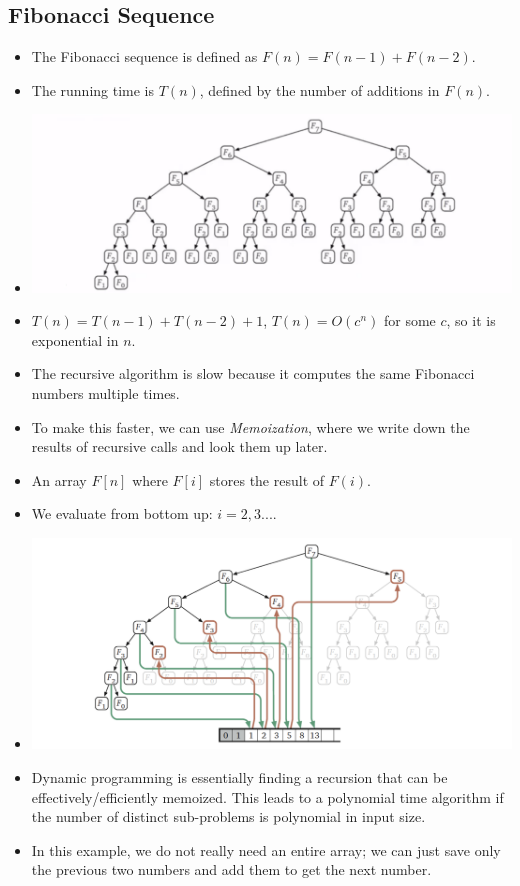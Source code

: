 \subsection{Fibonacci Sequence}
\begin{itemize}
    \item The Fibonacci sequence is defined as $F(n) = F(n - 1) + F(n - 2)$.
    \item The running time is $T(n)$, defined by the number of additions in $F(n)$.
    \item[] \includegraphics[width=\textwidth]{lecture13/images/fib-without-memo.png}
    \item $T(n) = T(n - 1) + T(n - 2) + 1$, $T(n) = O(c^n)$ for some $c$, so it is exponential in $n$.
    \item The recursive algorithm is slow because it computes the same Fibonacci numbers multiple times.
    \item To make this faster, we can use \textit{Memoization}, where we write down the results of recursive calls and look them up later.
    \item An array $F[n]$ where $F[i]$ stores the result of $F(i)$.
    \item We evaluate from bottom up: $i = 2, 3...$.
    \item[] \includegraphics[width=\textwidth]{lecture13/images/fib-with-memo.png}
    \item Dynamic programming is essentially finding a recursion that can be effectively/efficiently memoized. This leads to a polynomial time algorithm if the number of distinct sub-problems is polynomial in input size.
    \item In this example, we do not really need an entire array; we can just save only the previous two numbers and add them to get the next number.
\end{itemize}

